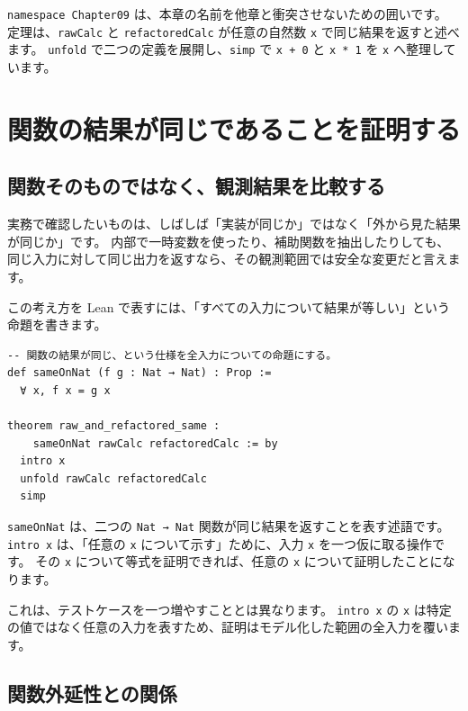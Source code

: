 \texttt{namespace Chapter09} は、本章の名前を他章と衝突させないための囲いです。
定理は、\texttt{rawCalc} と \texttt{refactoredCalc} が任意の自然数 \texttt{x} で同じ結果を返すと述べます。
\texttt{unfold} で二つの定義を展開し、\texttt{simp} で \texttt{x + 0} と \texttt{x * 1} を \texttt{x} へ整理しています。

\section{関数の結果が同じであることを証明する}

\subsection{関数そのものではなく、観測結果を比較する}

実務で確認したいものは、しばしば「実装が同じか」ではなく「外から見た結果が同じか」です。
内部で一時変数を使ったり、補助関数を抽出したりしても、同じ入力に対して同じ出力を返すなら、その観測範囲では安全な変更だと言えます。

この考え方を Lean で表すには、「すべての入力について結果が等しい」という命題を書きます。

\begin{listing}[htbp]
\begin{verbatim}
-- 関数の結果が同じ、という仕様を全入力についての命題にする。
def sameOnNat (f g : Nat → Nat) : Prop :=
  ∀ x, f x = g x

theorem raw_and_refactored_same :
    sameOnNat rawCalc refactoredCalc := by
  intro x
  unfold rawCalc refactoredCalc
  simp
\end{verbatim}
\caption{\texttt{sameOnNat}}
\label{lst:ch09_same_on_nat}
\end{listing}

\texttt{sameOnNat} は、二つの \texttt{Nat → Nat} 関数が同じ結果を返すことを表す述語です。
\texttt{intro x} は、「任意の \texttt{x} について示す」ために、入力 \texttt{x} を一つ仮に取る操作です。
その \texttt{x} について等式を証明できれば、任意の \texttt{x} について証明したことになります。

これは、テストケースを一つ増やすこととは異なります。
\texttt{intro x} の \texttt{x} は特定の値ではなく任意の入力を表すため、証明はモデル化した範囲の全入力を覆います。

\subsection{関数外延性との関係}

